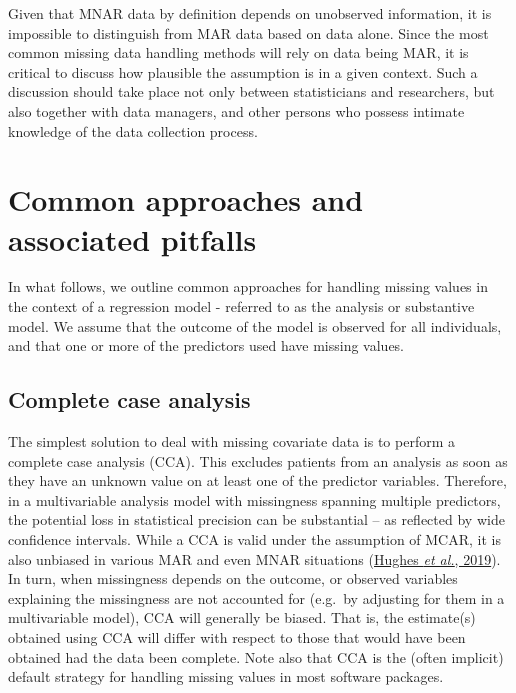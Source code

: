 \documentclass[
  letterpaper,
  DIV=11,
  numbers=noendperiod]{scrreprt}
\begin{document}
Given that MNAR data by definition depends on unobserved information, it
is impossible to distinguish from MAR data based on data alone. Since
the most common missing data handling methods will rely on data being
MAR, it is critical to discuss how plausible the assumption is in a
given context. Such a discussion should take place not only between
statisticians and researchers, but also together with data managers, and
other persons who possess intimate knowledge of the data collection
process.

\hypertarget{common-approaches-and-associated-pitfalls}{%
\section{Common approaches and associated
pitfalls}\label{common-approaches-and-associated-pitfalls}}

In what follows, we outline common approaches for handling missing
values in the context of a regression model - referred to as the
analysis or substantive model. We assume that the outcome of the model
is observed for all individuals, and that one or more of the predictors
used have missing values.

\hypertarget{complete-case-analysis}{%
\subsection{Complete case analysis}\label{complete-case-analysis}}

The simplest solution to deal with missing covariate data is to perform
a complete case analysis (CCA). This excludes patients from an analysis
as soon as they have an unknown value on at least one of the predictor
variables. Therefore, in a multivariable analysis model with missingness
spanning multiple predictors, the potential loss in statistical
precision can be substantial -- as reflected by wide confidence
intervals. While a CCA is valid under the assumption of MCAR, it is also
unbiased in various MAR and even MNAR situations
(\protect\hyperlink{ref-hughesAccountingMissingData2019}{Hughes \emph{et
al.}, 2019}). In turn, when missingness depends on the outcome, or
observed variables explaining the missingness are not accounted for
(e.g.~by adjusting for them in a multivariable model), CCA will
generally be biased. That is, the estimate(s) obtained using CCA will
differ with respect to those that would have been obtained had the data
been complete. Note also that CCA is the (often implicit) default
strategy for handling missing values in most software packages.
\end{document}
